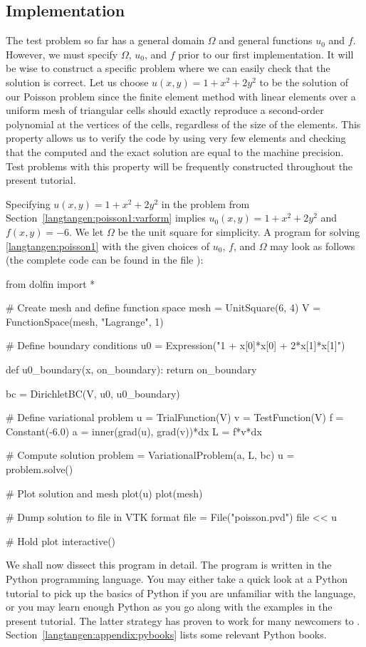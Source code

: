 \subsection{Implementation}
\label{langtangen:poisson1:impl}

The test problem so far has a general domain $\Omega$ and general
functions $u_0$ and $f$. However, we must specify $\Omega$, $u_0$, and
$f$ prior to our first implementation.  It will be wise to construct a
specific problem where we can easily check that the solution is correct.
Let us choose $u(x,y)=1 + x^2 + 2y^2$ to be the solution of our Poisson
problem since the finite element method with linear elements over a
uniform mesh of triangular cells should exactly reproduce a second-order
polynomial at the vertices of the cells, regardless of the size of
the elements. This property allows us to verify the code by using very
few elements and checking that the computed and the exact solution are
equal to the machine precision.  Test problems with this property will
be frequently constructed throughout the present tutorial.

Specifying $u(x,y)=1 + x^2 + 2y^2$ in the problem from
Section~\ref{langtangen:poisson1:varform} implies $u_0(x,y)= 1 + x^2 +
2y^2$ and $f(x,y)=-6$.  We let $\Omega$ be the unit square for simplicity.
A \fenics{} program for solving \eqref{langtangen:poisson1} with the
given choices of $u_0$, $f$, and $\Omega$ may look as follows (the
complete code can be found in the file ):
\begin{python}
from dolfin import *

# Create mesh and define function space
mesh = UnitSquare(6, 4)
V = FunctionSpace(mesh, "Lagrange", 1)

# Define boundary conditions
u0 = Expression("1 + x[0]*x[0] + 2*x[1]*x[1]")

def u0_boundary(x, on_boundary):
    return on_boundary

bc = DirichletBC(V, u0, u0_boundary)

# Define variational problem
u = TrialFunction(V)
v = TestFunction(V)
f = Constant(-6.0)
a = inner(grad(u), grad(v))*dx
L = f*v*dx

# Compute solution
problem = VariationalProblem(a, L, bc)
u = problem.solve()

# Plot solution and mesh
plot(u)
plot(mesh)

# Dump solution to file in VTK format
file = File("poisson.pvd")
file << u

# Hold plot
interactive()
\end{python}
We shall now dissect this \fenics{} program in detail. The program
is written in the Python programming language.  You may either take a
quick look at a Python tutorial \citep{PythonTutorial} to pick up the
basics of Python if you are unfamiliar with the language, or you may
learn enough Python as you go along with the examples in the present
tutorial. The latter strategy has proven to work for many newcomers
to \fenics.
Section~\ref{langtangen:appendix:pybooks} lists some relevant Python
books.

